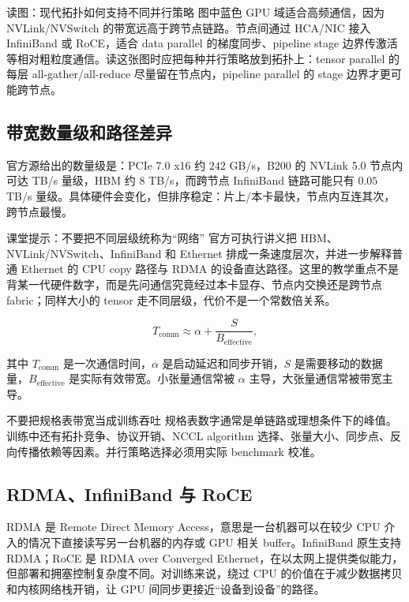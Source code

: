 \documentclass[a4paper]{article}
\begin{document}
\begin{knowledgebox}{读图：现代拓扑如何支持不同并行策略}
图中蓝色 GPU 域适合高频通信，因为 NVLink/NVSwitch 的带宽远高于跨节点链路。节点间通过 HCA/NIC 接入 InfiniBand 或 RoCE，适合 data parallel 的梯度同步、pipeline stage 边界传激活等相对粗粒度通信。读这张图时应把每种并行策略放到拓扑上：tensor parallel 的每层 all-gather/all-reduce 尽量留在节点内，pipeline parallel 的 stage 边界才更可能跨节点。
\end{knowledgebox}

\subsection{带宽数量级和路径差异}

官方源给出的数量级是：PCIe 7.0 x16 约 \(242\) GB/s，B200 的 NVLink 5.0 节点内可达 TB/s 量级，HBM 约 \(8\) TB/s，而跨节点 InfiniBand 链路可能只有 \(0.05\) TB/s 量级。具体硬件会变化，但排序稳定：片上/本卡最快，节点内互连其次，跨节点最慢。

\begin{knowledgebox}{课堂提示：不要把不同层级统称为“网络”}
官方可执行讲义把 HBM、NVLink/NVSwitch、InfiniBand 和 Ethernet 排成一条速度层次，并进一步解释普通 Ethernet 的 CPU copy 路径与 RDMA 的设备直达路径。这里的教学重点不是背某一代硬件数字，而是先问通信究竟经过本卡显存、节点内交换还是跨节点 fabric；同样大小的 tensor 走不同层级，代价不是一个常数倍关系。
\end{knowledgebox}

\[
T_{\text{comm}} \approx \alpha + \frac{S}{B_{\text{effective}}},
\]

其中 \(T_{\text{comm}}\) 是一次通信时间，\(\alpha\) 是启动延迟和同步开销，\(S\) 是需要移动的数据量，\(B_{\text{effective}}\) 是实际有效带宽。小张量通信常被 \(\alpha\) 主导，大张量通信常被带宽主导。

\begin{warningbox}{不要把规格表带宽当成训练吞吐}
规格表数字通常是单链路或理想条件下的峰值。训练中还有拓扑竞争、协议开销、NCCL algorithm 选择、张量大小、同步点、反向传播依赖等因素。并行策略选择必须用实际 benchmark 校准。
\end{warningbox}

\subsection{RDMA、InfiniBand 与 RoCE}

RDMA 是 Remote Direct Memory Access，意思是一台机器可以在较少 CPU 介入的情况下直接读写另一台机器的内存或 GPU 相关 buffer。InfiniBand 原生支持 RDMA；RoCE 是 RDMA over Converged Ethernet，在以太网上提供类似能力，但部署和拥塞控制复杂度不同。对训练来说，绕过 CPU 的价值在于减少数据拷贝和内核网络栈开销，让 GPU 间同步更接近“设备到设备”的路径。
\end{document}
